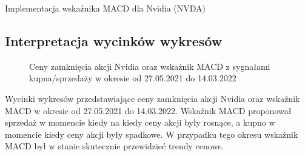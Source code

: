 \documentclass{article}
\begin{document}
\begin{section}{Implementacja wskaźnika MACD dla Nvidia (NVDA)}
    \subsection{Interpretacja wycinków wykresów}
    \begin{figure}[H]
        \caption{Ceny zamknięcia akcji Nvidia oraz wskaźnik MACD z sygnałami kupna/sprzedaży w okresie od 27.05.2021 do 14.03.2022}
    \end{figure}
    Wycinki wykresów przedstawiające ceny zamknięcia akcji Nvidia oraz wskaźnik MACD w okresie od 27.05.2021 do 14.03.2022.
    Wskaźnik MACD proponował sprzedaż w momencie kiedy na kiedy ceny akcji były rosnące, a kupno w momencie kiedy ceny akcji były spadkowe.
    W przypadku tego okresu wskaźnik MACD był w stanie skutecznie przewidzieć trendy cenowe.


\end{section}
\end{document}
